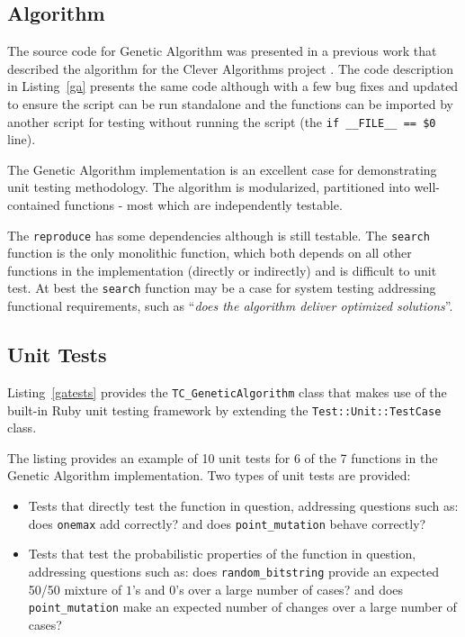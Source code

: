 \documentclass[a4paper, 11pt]{article}
\begin{document}
\subsection{Algorithm}
\label{subsec:algorithm}
The source code for Genetic Algorithm was presented in a previous work that described the algorithm for the Clever Algorithms project \cite{Brownlee2010p}. The code description in Listing~\ref{ga} presents the same code although with a few bug fixes and updated to ensure the script can be run standalone and the functions can be imported by another script for testing without running the script (the \texttt{if \_\_FILE\_\_ == \$0} line). 

The Genetic Algorithm implementation is an excellent case for demonstrating unit testing methodology. The algorithm is modularized, partitioned into well-contained functions - most which are independently testable. 

The \texttt{reproduce} has some dependencies although is still testable. The \texttt{search} function is the only monolithic function, which both depends on all other functions in the implementation (directly or indirectly) and is difficult to unit test. At best the \texttt{search} function may be a case for system testing addressing functional requirements, such as ``\emph{does the algorithm deliver optimized solutions}''.



\subsection{Unit Tests}
\label{subsec:tests}
Listing~\ref{gatests} provides the \texttt{TC\_GeneticAlgorithm} class that makes use of the built-in Ruby unit testing framework by extending the \texttt{Test::Unit::TestCase} class.

The listing provides an example of 10 unit tests for 6 of the 7 functions in the Genetic Algorithm implementation. Two types of unit tests are provided: 

\begin{itemize}
	\item Tests that directly test the function in question, addressing questions such as: does \texttt{onemax} add correctly? and does \texttt{point\_mutation} behave correctly?
	\item Tests that test the probabilistic properties of the function in question, addressing questions such as: does \texttt{random\_bitstring} provide an expected 50/50 mixture of $1$'s and $0$'s over a large number of cases? and does \texttt{point\_mutation} make an expected number of changes over a large number of cases?
\end{itemize}
\end{document}
